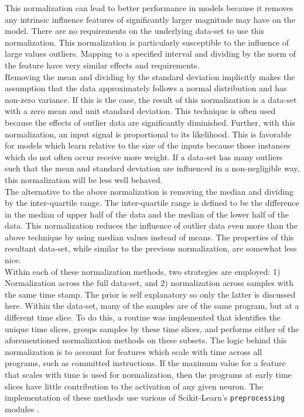 \documentclass[paper=a4, fontsize=11pt]{scrartcl} %
\begin{document}
This normalization can lead to better performance in models because it removes any intrinsic influence features of significantly larger magnitude may have on the model.
There are no requirements on the underlying data-set to use this normalization.
This normalization is particularly susceptible to the influence of large values outliers.
Mapping to a specified interval and dividing by the norm of the feature have very similar effects and requirements.
\\
Removing the mean and dividing by the standard deviation implicitly makes the assumption that the data approximately follows a normal distribution and has non-zero variance.
If this is the case, the result of this normalization is a data-set with a zero mean and unit standard deviation.
This technique is often used because the effects of outlier data are significantly diminished.
Further, with this normalization, an input signal is proportional to its likelihood.
This is favorable for models which learn relative to the size of the inputs because those instances which do not often occur receive more weight.
If a data-set has many outliers such that the mean and standard deviation are influenced in a non-negligible way, this normalization will be less well behaved.
\\
The alternative to the above normalization is removing the median and dividing by the inter-quartile range.
The inter-quartile range is defined to be the difference in the median of upper half of the data and the median of the lower half of the data.
This normalization reduces the influence of outlier data even more than the above technique by using median values instead of means.
The properties of this resultant data-set, while similar to the previous normalization, are somewhat less nice.
\\
Within each of these normalization methods, two strategies are employed: 1) Normalization across the full data-set, and 2) normalization across samples with the same time stamp.
The prior is self explanatory so only the latter is discussed here.
Within the data-set, many of the samples are of the same program, but at a different time slice.
To do this, a routine was implemented that identifies the unique time slices, groups samples by these time slices, and performs either of the aforementioned normalization methods on these subsets.
The logic behind this normalization is to account for features which scale with time across all programs, such as committed instructions.
If the maximum value for a feature that scales with time is used for normalization, then the programs at early time slices have little contribution to the activation of any given neuron.
The implementation of these methods use various of Scikit-Learn's \verb|preprocessing| modules \cite{scikit-learn}.
\\
\end{document}
